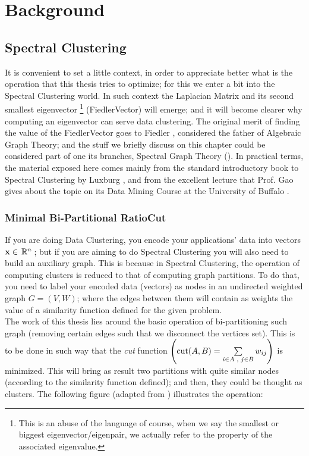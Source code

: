 \chapter{Background}
\label{cha:backg}

\section{Spectral Clustering}

It is convenient to set a little context, in order to appreciate
better what is the operation that this thesis tries to optimize; for
this we enter a bit into the Spectral Clustering world. In such
context the \gls{Laplacian} Matrix and its second smallest eigenvector
\footnote{This is an abuse of the language of course, when
we say the smallest or biggest eigenvector/eigenpair, we actually refer to
the property of the associated eigenvalue.}
(\gls{FiedlerVector}) will emerge; and it will become clearer why computing
an eigenvector can serve data clustering. The original merit of
finding the value of the \gls{FiedlerVector} goes to Fiedler
\cite{fiedler73}, considered the father of Algebraic Graph Theory; and
the stuff we briefly discuss on this chapter could be considered part
of one its branches, Spectral Graph Theory (\cite{brouwer12}). In
practical terms, the material exposed here comes mainly from the
standard introductory book to Spectral Clustering by Luxburg \cite{luxburg07},
and from the excellent lecture that Prof. Gao gives about the topic on
its Data Mining Course at the University of Buffalo \cite{gao13}.

\subsection{Minimal Bi-Partitional RatioCut}

If you are doing Data Clustering, you encode your applications' data
into vectors $\mathbf{x} \in \,\mathbb{R}^{n}\,$; but if you are aiming to do Spectral
Clustering you will also need to build an auxiliary graph. This is
because in Spectral Clustering, the operation of computing clusters is
reduced to that of computing graph partitions. To do that, you need to
label your encoded data (vectors) as nodes in an undirected weighted graph $G =
(V,W)$; where the edges between them will contain as weights the value 
of a similarity function defined for the given problem. \\

The work of this thesis lies around the basic operation of
bi-partitioning such graph (removing certain edges such that we
disconnect the vertices set). This is to be done in such way that the
\emph{cut} function $\left(\operatorname{cut}(A,B) = \sum\limits_{\tiny{i \in A
    \ensuremath{\,\,,\,\,} j \in B}} w_{ij}\right)$ is minimized. This will bring as result
two partitions with quite similar nodes (according to the similarity
function defined); and then, they could be thought as clusters. The
following figure (adapted from \cite{gao13}) illustrates the
operation:

